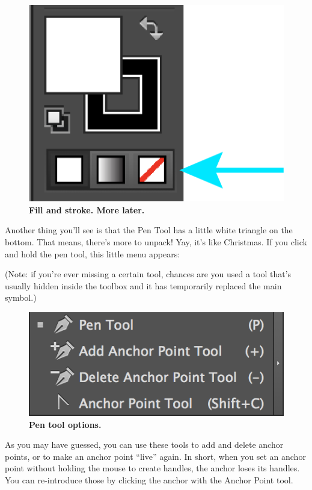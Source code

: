 \documentclass[]{article}
\begin{document}
\begin{figure}
\centering
\includegraphics{fillstroke1.png}
\caption{\textbf{Fill and stroke. More later.}}
\end{figure}

Another thing you'll see is that the Pen Tool has a little white
triangle on the bottom. That means, there's more to unpack! Yay, it's
like Christmas. If you click and hold the pen tool, this little menu
appears:

(Note: if you're ever missing a certain tool, chances are you used a
tool that's usually hidden inside the toolbox and it has temporarily
replaced the main symbol.)

\begin{figure}
\centering
\includegraphics{PenTool2.png}
\caption{\textbf{Pen tool options.}}
\end{figure}

As you may have guessed, you can use these tools to add and delete
anchor points, or to make an anchor point ``live'' again. In short, when
you set an anchor point without holding the mouse to create handles, the
anchor loses its handles. You can re-introduce those by clicking the
anchor with the Anchor Point tool.
\end{document}
